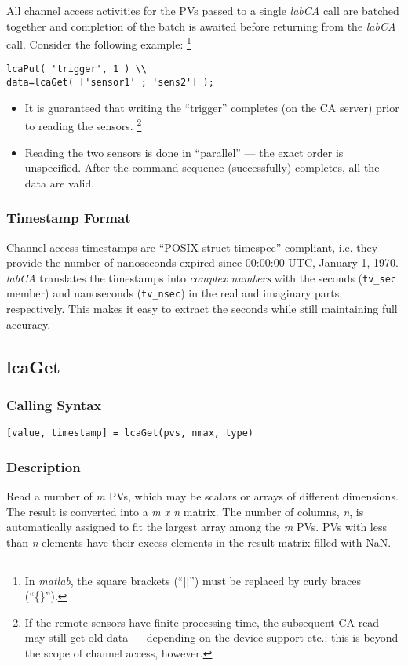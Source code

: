 \documentclass{article}
\newcommand{\sca}{\ita{labCA}}
\newcommand{\matlab}{\ita{matlab}}
\newcommand{\com}[1]{{\tt #1}}
\newcommand{\NAN}{\mbox{NaN}}
\newcommand{\ita}[1]{\emph{#1}}
\newcommand{\m}{$m$}
\newcommand{\n}{$n$}
\newcommand{\mxn}{$m\times n$}
\renewcommand{\m}{\ita{m}}
\renewcommand{\n}{\ita{n}}
\renewcommand{\mxn}{\ita{m x n}}
\begin{document}
All channel access activities for the PVs
passed to a single \sca{} call are batched together and
completion of the batch is awaited before returning from
the \sca{} call. Consider the following example:%
\footnote{
In \matlab{}, the square brackets (``[]'') must be replaced
by curly braces (``\{\}'').}
\begin{verbatim}
lcaPut( 'trigger', 1 ) \\
data=lcaGet( ['sensor1' ; 'sens2'] );
\end{verbatim}
\begin{itemize}
%
\item It is guaranteed that writing the ``trigger''
completes (on the CA server) prior to reading the
sensors.%
\footnote{If the remote sensors have finite
processing time, the subsequent CA read may still
get old data --- depending on the device support
etc.; this is beyond the scope of channel access, however.}
%
\item Reading the two sensors is done in ``parallel'' ---
the exact order is unspecified. After the command sequence
(successfully) completes, all the data are valid.
\end{itemize}

\subsubsection{Timestamp Format}
\label{tsformat}
Channel access timestamps are ``POSIX struct timespec''
compliant, i.e. they provide the number of nanoseconds
expired since 00:00:00 UTC, January 1, 1970. \sca{} 
translates the timestamps into \ita{complex numbers}
with the seconds (\com{tv\_sec} member) and nanoseconds
(\com{tv\_nsec}) in the real and imaginary parts, respectively.
This makes it easy to extract the seconds while still maintaining
full accuracy.

\vspace*{\fill}

\subsection{lcaGet}
\label{lcaget}
\subsubsection{Calling Syntax}
\begin{verbatim}
[value, timestamp] = lcaGet(pvs, nmax, type)
\end{verbatim}
\subsubsection{Description}
Read a number of \m{} PVs, which may be scalars or arrays of
different dimensions. The result is converted into a \mxn{}
matrix. The number of columns, \n, is automatically assigned
to fit the largest array among the \m{} PVs.  PVs with less than
\n{} elements have their excess elements in the result matrix
filled with \NAN.
\end{document}
